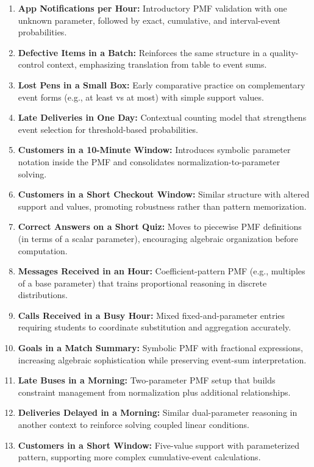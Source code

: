 \begin{enumerate}
  \item \textbf{App Notifications per Hour:} Introductory PMF validation with one unknown parameter, followed by exact, cumulative, and interval-event probabilities.
  \item \textbf{Defective Items in a Batch:} Reinforces the same structure in a quality-control context, emphasizing translation from table to event sums.
  \item \textbf{Lost Pens in a Small Box:} Early comparative practice on complementary event forms (e.g., at least vs at most) with simple support values.
  \item \textbf{Late Deliveries in One Day:} Contextual counting model that strengthens event selection for threshold-based probabilities.
  \item \textbf{Customers in a 10-Minute Window:} Introduces symbolic parameter notation inside the PMF and consolidates normalization-to-parameter solving.
  \item \textbf{Customers in a Short Checkout Window:} Similar structure with altered support and values, promoting robustness rather than pattern memorization.
  \item \textbf{Correct Answers on a Short Quiz:} Moves to piecewise PMF definitions (in terms of a scalar parameter), encouraging algebraic organization before computation.
  \item \textbf{Messages Received in an Hour:} Coefficient-pattern PMF (e.g., multiples of a base parameter) that trains proportional reasoning in discrete distributions.
  \item \textbf{Calls Received in a Busy Hour:} Mixed fixed-and-parameter entries requiring students to coordinate substitution and aggregation accurately.
  \item \textbf{Goals in a Match Summary:} Symbolic PMF with fractional expressions, increasing algebraic sophistication while preserving event-sum interpretation.
  \item \textbf{Late Buses in a Morning:} Two-parameter PMF setup that builds constraint management from normalization plus additional relationships.
  \item \textbf{Deliveries Delayed in a Morning:} Similar dual-parameter reasoning in another context to reinforce solving coupled linear conditions.
  \item \textbf{Customers in a Short Window:} Five-value support with parameterized pattern, supporting more complex cumulative-event calculations.

\end{enumerate}
